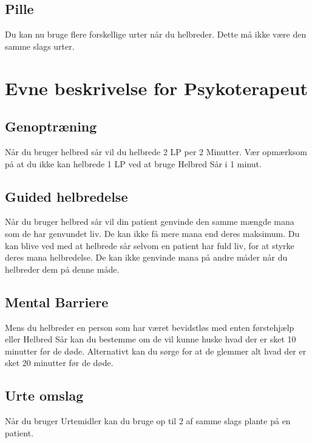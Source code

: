 \subsection{Pille}
Du kan nu bruge flere forskellige urter når du helbreder. Dette må ikke være den samme slags urter.

\section{Evne beskrivelse for Psykoterapeut}

\subsection{Genoptræning}
Når du bruger helbred sår vil du helbrede 2 LP per 2 Minutter. Vær opmærksom på at du ikke kan helbrede 1 LP ved at bruge Helbred Sår i 1 minut.

\subsection{Guided helbredelse}
Når du bruger helbred sår vil din patient genvinde den samme mængde mana som de har genvundet liv. De kan ikke få mere mana end deres maksimum. Du kan blive ved med at helbrede sår selvom en patient har fuld liv, for at styrke deres mana helbredelse. De kan ikke genvinde mana på andre måder når du helbreder dem på denne måde.

\subsection{Mental Barriere}
Mens du helbreder en person som har været bevidstløs med enten førstehjælp eller Helbred Sår kan du bestemme om de vil kunne huske hvad der er sket 10 minutter før de døde. Alternativt kan du sørge for at de glemmer alt hvad der er sket 20 minutter før de døde.

\subsection{Urte omslag}
Når du bruger Urtemidler kan du bruge op til 2 af samme slags plante på en patient.
